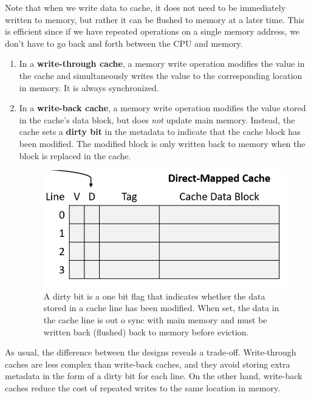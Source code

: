    \begin{definition}
      Note that when we write data to cache, it does not need to be immediately written to memory, but rather it can be flushed to memory at a later time. This is efficient since if we have repeated operations on a single memory address, we don't have to go back and forth between the CPU and memory. 
      \begin{enumerate}
        \item In a \textbf{write-through cache}, a memory write operation modifies the value in the cache and simultaneously writes the value to the corresponding location in memory. It is always synchronized. 
        \item In a \textbf{write-back cache}, a memory write operation modifies the value stored in the cache's data block, but does \textit{not} update main memory. Instead, the cache sets a \textbf{dirty bit} in the metadata to indicate that the cache block has been modified. The modified block is only written back to memory when the block is replaced in the cache. 

        \begin{figure}[H]
          \centering 
          \includegraphics[scale=0.4]{img/dirty_bit.png}
          \caption{A dirty bit is a one bit flag that indicates whether the data stored in a cache line has been modified. When set, the data in the cache line is out o sync with main memory and must be written back (flushed) back to memory before eviction. } 
          \label{fig:dirty_bit}
        \end{figure}
      \end{enumerate}
      As usual, the difference between the designs reveals a trade-off. Write-through caches are less complex than write-back caches, and they avoid storing extra metadata in the form of a dirty bit for each line. On the other hand, write-back caches reduce the cost of repeated writes to the same location in memory.
    \end{definition}

